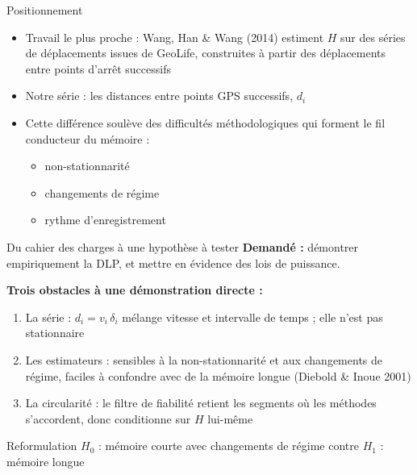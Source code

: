 \documentclass[aspectratio=169,11pt]{beamer}
\begin{document}
\begin{frame}{Positionnement}
\begin{itemize}
  \item Travail le plus proche : Wang, Han \& Wang (2014) estiment $H$ sur des séries de déplacements issues de GeoLife, construites à partir des \alert{déplacements entre points d'arrêt successifs}
  \item Notre série : les \alert{distances entre points GPS successifs}, $d_i$
  \item Cette différence soulève des difficultés méthodologiques qui forment le fil conducteur du mémoire :
  \begin{itemize}
    \item non-stationnarité
    \item changements de régime
    \item rythme d'enregistrement
  \end{itemize}
\end{itemize}
\end{frame}

\begin{frame}{Du cahier des charges à une hypothèse à tester}
\textbf{Demandé :} \og démontrer empiriquement \fg{} la DLP, et mettre en évidence des lois de puissance.

\medskip
\textbf{Trois obstacles à une démonstration directe :}
\begin{enumerate}
  \item \alert{La série} : $d_i=v_i\,\delta_i$ mélange vitesse et intervalle de temps ; elle n'est pas stationnaire
  \item \alert{Les estimateurs} : sensibles à la non-stationnarité et aux changements de régime, faciles à confondre avec de la mémoire longue (Diebold \& Inoue 2001)
  \item \alert{La circularité} : le filtre de fiabilité retient les segments où les méthodes s'accordent, donc conditionne sur $H$ lui-même
\end{enumerate}
\begin{block}{Reformulation}
$H_0$ : mémoire courte avec changements de régime \quad contre \quad $H_1$ : mémoire longue
\end{block}
\end{frame}
\end{document}
